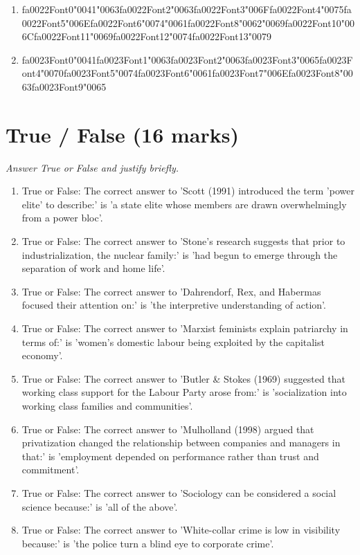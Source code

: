\documentclass[12pt]{article}
\begin{document}
\begin{enumerate}[label=\arabic*.]
\begin{enumerate}[label=(\alph*)]
    \item {\csname fa0022Font0\endcsname\char"0041}{\char"0063}{\csname fa0022Font2\endcsname\char"0063}{\csname fa0022Font3\endcsname\char"006F}{\csname fa0022Font4\endcsname\char"0075}{\csname fa0022Font5\endcsname\char"006E}{\csname fa0022Font6\endcsname\char"0074}{\char"0061}{\csname fa0022Font8\endcsname\char"0062}{\char"0069}{\csname fa0022Font10\endcsname\char"006C}{\csname fa0022Font11\endcsname\char"0069}{\csname fa0022Font12\endcsname\char"0074}{\csname fa0022Font13\endcsname\char"0079}
    \item {\csname fa0023Font0\endcsname\char"0041}{\csname fa0023Font1\endcsname\char"0063}{\csname fa0023Font2\endcsname\char"0063}{\csname fa0023Font3\endcsname\char"0065}{\csname fa0023Font4\endcsname\char"0070}{\csname fa0023Font5\endcsname\char"0074}{\csname fa0023Font6\endcsname\char"0061}{\csname fa0023Font7\endcsname\char"006E}{\csname fa0023Font8\endcsname\char"0063}{\csname fa0023Font9\endcsname\char"0065}
\end{enumerate}
\end{enumerate}

\section*{True / False (16 marks)}
\textit{Answer True or False and justify briefly.}
\begin{enumerate}[label=\arabic*.]
\item True or False: The correct answer to 'Scott (1991) introduced the term 'power elite' to describe:' is 'a state elite whose members are drawn overwhelmingly from a power bloc'.
\item True or False: The correct answer to 'Stone's research suggests that prior to industrialization, the nuclear family:' is 'had begun to emerge through the separation of work and home life'.
\item True or False: The correct answer to 'Dahrendorf, Rex, and Habermas focused their attention on:' is 'the interpretive understanding of action'.
\item True or False: The correct answer to 'Marxist feminists explain patriarchy in terms of:' is 'women's domestic labour being exploited by the capitalist economy'.
\item True or False: The correct answer to 'Butler \& Stokes (1969) suggested that working class support for the Labour Party arose from:' is 'socialization into working class families and communities'.
\item True or False: The correct answer to 'Mulholland (1998) argued that privatization changed the relationship between companies and managers in that:' is 'employment depended on performance rather than trust and commitment'.
\item True or False: The correct answer to 'Sociology can be considered a social science because:' is 'all of the above'.
\item True or False: The correct answer to 'White-collar crime is low in visibility because:' is 'the police turn a blind eye to corporate crime'.
\end{enumerate}
\end{document}
